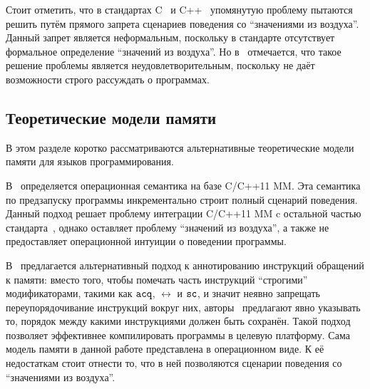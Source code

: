 
Стоит отметить, что в стандартах C~\cite{C:11} и C++~\cite{CPP:11, CPP:14} упомянутую проблему пытаются решить
путём прямого запрета сценариев поведения со ``значениями из воздуха''.
Данный запрет является неформальным, поскольку в стандарте отсутствует формальное определение
``значений из воздуха''.
Но в~\cite{Boehm-Demsky:MSPC14} отмечается, что такое решение проблемы
является неудовлетворительным, поскольку не даёт возможности строго рассуждать
о программах.


\subsection{Теоретические модели памяти}
В этом разделе коротко рассматриваются альтернативные теоретические модели памяти для языков программирования.

В~\cite{Nienhuis-al:OOPSLA16} определяется операционная семантика на базе C/C++11 MM.
Эта семантика по предзапуску программы инкрементально строит полный сценарий поведения.
Данный подход решает проблему интеграции C/C++11 MM c
остальной частью стандарта~\cite{Memarian-al:PLDI16},
однако оставляет проблему ``значений из воздуха'', а также не предоставляет операционной интуиции
о поведении программы.

В~\cite{Crary-Sullivan:POPL15} предлагается альтернативный подход к аннотированию инструкций обращений к памяти:
вместо того, чтобы помечать часть инструкций ``строгими'' модификаторами, такими как ${\mathtt{acq}}$, $\rel$ и ${\mathtt{sc}}$,
и значит неявно запрещать переупорядочивание инструкций вокруг них,
авторы~\cite{Crary-Sullivan:POPL15} предлагают
явно указывать то, порядок между какими инструкциями должен быть сохранён.
Такой подход позволяет эффективнее компилировать программы в целевую платформу.
Сама модель памяти в данной работе представлена в операционном виде.
К её недостаткам стоит отнести то, что в ней позволяются сценарии поведения со ``значениями из воздуха''.

